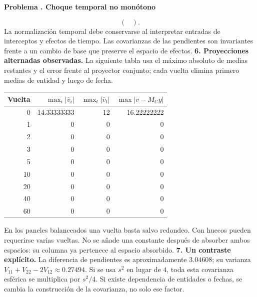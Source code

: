 \documentclass[11pt,a4paper]{article}
\theoremstyle{definition}
\newcounter{problema}
\newenvironment{resuelto}[1]{\refstepcounter{problema}\par\medskip\Needspace{6\baselineskip}\textbf{Problema \theproblema. #1}\par}{\par\medskip}
\begin{document}
\begin{resuelto}{Choque temporal no monótono}
{\[\begin{pmatrix}
\end{pmatrix}.
\]
}
La normalización temporal debe conservarse al interpretar entradas de interceptos y efectos de tiempo. Las covarianzas de las pendientes son invariantes frente a un cambio de base que preserve el espacio de efectos.
\textbf{6. Proyecciones alternadas observadas.} La siguiente tabla usa el máximo absoluto de medias restantes y el error frente al proyector conjunto; cada vuelta elimina primero medias de entidad y luego de fecha.

\begin{center}\small
\begin{tabular}{rrrr}
\toprule
Vuelta&$\max_i|\bar v_i|$&$\max_t|\bar v_t|$&$\max|v-M_Cy|$\\
\midrule
0&14.33333333&12&16.22222222\\
1&0&0&0\\
2&0&0&0\\
3&0&0&0\\
5&0&0&0\\
10&0&0&0\\
20&0&0&0\\
40&0&0&0\\
60&0&0&0\\
\bottomrule
\end{tabular}
\end{center}
En los paneles balanceados una vuelta basta salvo redondeo. Con huecos pueden requerirse varias vueltas. No se añade una constante después de absorber ambos espacios: su columna ya pertenece al espacio absorbido.
\textbf{7. Un contraste explícito.} La diferencia de pendientes es aproximadamente $3.04608$; su varianza $V_{11}+V_{22}-2V_{12}\approx0.27494$. Si se usa $s^2$ en lugar de $4$, toda esta covarianza esférica se multiplica por $s^2/4$. Si existe dependencia de entidades o fechas, se cambia la construcción de la covarianza, no solo ese factor.
\end{resuelto}
\end{document}
